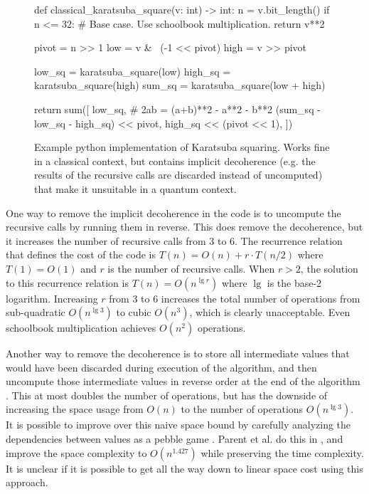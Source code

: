 \documentclass[onecolumn]{quantumarticle}
\begin{document}
\begin{figure}
\begin{python}
def classical_karatsuba_square(v: int) -> int:
    n = v.bit_length()
    if n <= 32:
        # Base case. Use schoolbook multiplication.
        return v**2

    pivot = n >> 1
    low = v & ~(-1 << pivot)
    high = v >> pivot

    low_sq = karatsuba_square(low)
    high_sq = karatsuba_square(high)
    sum_sq = karatsuba_square(low + high)

    return sum([
        low_sq,
        # 2ab = (a+b)**2 - a**2 - b**2
        (sum_sq - low_sq - high_sq) << pivot,
        high_sq << (pivot << 1),
    ])
\end{python}
\caption{
\label{fig:classical_code}
   Example python implementation of Karatsuba squaring.
   Works fine in a classical context, but contains implicit decoherence (e.g. the results of the recursive calls are discarded instead of uncomputed) that make it unsuitable in a quantum context.
}
\end{figure}

One way to remove the implicit decoherence in the code is to uncompute the recursive calls by running them in reverse.
This does remove the decoherence, but it increases the number of recursive calls from 3 to 6.
The recurrence relation that defines the cost of the code is $T(n) = O(n) + r \cdot T(n/2)$ where $T(1) = O(1)$ and $r$ is the number of recursive calls.
When $r>2$, the solution to this recurrence relation is $T(n) = O(n^{\lg r})$ where $\lg$ is the base-2 logarithm.
Increasing $r$ from 3 to 6 increases the total number of operations from sub-quadratic $O(n^{\lg 3})$ to cubic $O(n^3)$, which is clearly unacceptable.
Even schoolbook multiplication achieves $O(n^2)$ operations.

Another way to remove the decoherence is to store all intermediate values that would have been discarded during execution of the algorithm, and then uncompute those intermediate values in reverse order at the end of the algorithm \cite{bennett1973logical}.
This at most doubles the number of operations, but has the downside of increasing the space usage from $O(n)$ to the number of operations $O(n^{\lg 3})$.
It is possible to improve over this naive space bound by carefully analyzing the dependencies between values as a pebble game \cite{bennett1989pebble}.
Parent et al. do this in \cite{parent2017karatsuba}, and improve the space complexity to $O(n^{1.427})$ while preserving the time complexity.
It is unclear if it is possible to get all the way down to linear space cost using this approach.
\end{document}
